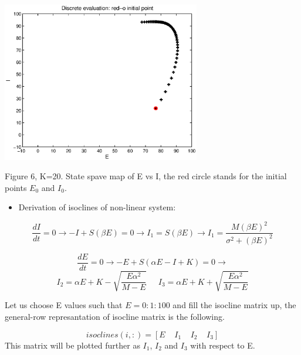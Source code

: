 \documentclass{article}
\begin{document}
\begin{center}
 \includegraphics[width=\textwidth, height=7cm]{linear2.eps}
\begin{footnotesize}Figure 6, K=20. State spave map of E vs I, the red circle stands for the initial points $E_0$ and $I_0$.  \end{footnotesize}
\end{center}

\begin{itemize}
 \item Derivation of isoclines of non-linear system:
\end{itemize}

\begin{equation*}
\frac{dI}{dt}=0\longrightarrow -I+S(\beta E)=0\longrightarrow I_1=S(\beta E)\longrightarrow I_1=\frac{M(\beta E)^2}{\sigma^2+(\beta E)^2} 
\end{equation*}

\begin{equation*}
 \frac{dE}{dt}=0\rightarrow -E+S(\alpha E-I+K)=0 \rightarrow
\end{equation*}
\begin{equation*}
I_2=\alpha E+K-\sqrt{\frac{E \alpha^2}{M-E}} \;\;\;\;\; I_3=\alpha E+K+\sqrt{\frac{E \alpha^2}{M-E}}
\end{equation*}

Let us choose E values such that $E=0:1:100$ and fill the isocline matrix up, the general-row represantation of isocline matrix is the following.

\begin{equation*}
 isoclines(i,:)=[E \;\;\;\;I_1\;\;\;\; I_2\;\;\;\; I_3]
\end{equation*}
This matrix will be plotted further as $I_1$, $I_2$ and $I_3$ with respect to E. 
\end{document}

